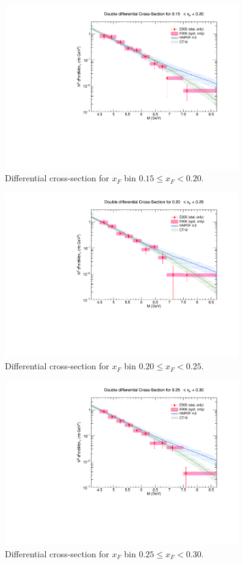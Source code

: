 \documentclass[11pt]{article}
\begin{document}
\clearpage
\begin{figure}[p]
\centering
\includegraphics[width=0.9\textwidth]{./XSecPlots/LH2_3_roofit.pdf}
\caption{Differential cross-section for $x_F$ bin $0.15 \leq x_F < 0.20$.}
\end{figure}
\clearpage
\begin{figure}[p]
\centering
\includegraphics[width=0.9\textwidth]{./XSecPlots/LH2_4_roofit.pdf}
\caption{Differential cross-section for $x_F$ bin $0.20 \leq x_F < 0.25$.}
\end{figure}
\clearpage
\begin{figure}[p]
\centering
\includegraphics[width=0.9\textwidth]{./XSecPlots/LH2_5_roofit.pdf}
\caption{Differential cross-section for $x_F$ bin $0.25 \leq x_F < 0.30$.}
\end{figure}
\end{document}
